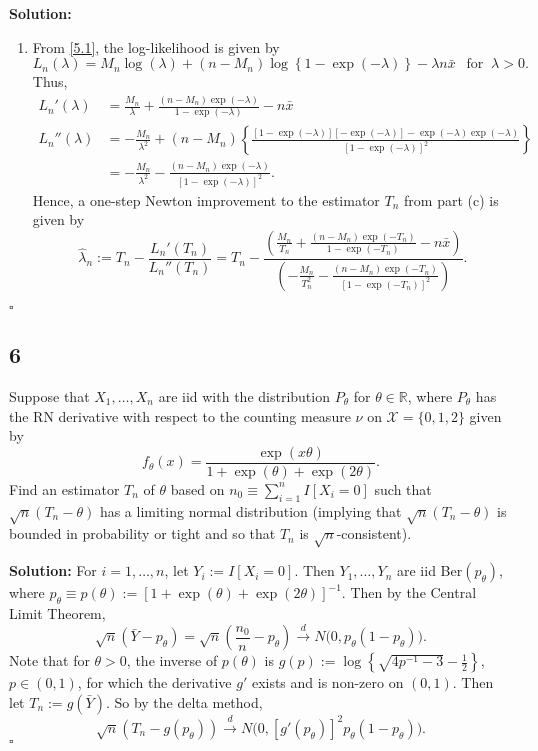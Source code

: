 \documentclass[12pt]{article}
\newcounter{ProofCounter}
\newenvironment{Solution}{\stepcounter{ProofCounter}\textbf{Solution:}}{\hfill$\square$}
\begin{document}
\begin{Solution}
\begin{enumerate}[label=(\alph*),leftmargin=6mm]
    \item From \eqref{5.1}, the log-likelihood is given by 
      \[
        L_n(\lambda) = M_n \log(\lambda) + (n - M_n)\log\left\{ 1 - \exp(-\lambda) \right\} - \lambda n \bar{x}\ \ \text{ for } \ \lambda > 0.
      \]
      Thus,
      \begin{align*}
        L_n'(\lambda) & = \frac{M_n}{\lambda} + \frac{(n-M_n)\exp(-\lambda)}{1 - \exp(-\lambda)} - n\bar{x} \\
        L_n''(\lambda) & = -\frac{M_n}{\lambda^2} + (n - M_n)\left\{ \frac{[1 - \exp(-\lambda)][-\exp(-\lambda)] - \exp(-\lambda)\exp(-\lambda)}{[1 -
        \exp(-\lambda)]^2}\right\} \\
        & = -\frac{M_n}{\lambda^2} - \frac{(n - M_n)\exp(-\lambda)}{[1 - \exp(-\lambda)]^{2}}.
      \end{align*}
      Hence, a one-step Newton improvement to the estimator $T_n$ from part (c) is given by 
      \[
        \hat{\lambda}_n := T_n - \frac{L_n'(T_n)}{L_n''(T_n)} = T_n - \frac{\left( \frac{M_n}{T_n} + \frac{(n-M_n)\exp(-T_n)}{1 - \exp(-T_n)} -
        n\bar{x} \right)}{\left( -\frac{M_n}{T_n^2} - \frac{(n - M_n)\exp(-T_n)}{[1 - \exp(-T_n)]^2} \right)}.
      \]
  \end{enumerate}
\end{Solution}


\subsection*{6}
\begin{tcolorbox}
  Suppose that $X_1,\ldots,X_n$ are iid with the distribution $P_\theta$ for $\theta \in \mathbb{R}$, where $P_\theta$ has the RN derivative with respect to the counting measure $\nu$ on $\mathcal{X}=\{0,1,2\}$ given by
  \[
    f_\theta(x)= \frac{\exp(x\theta)}{1+\exp(\theta)+\exp(2\theta)}.
  \]
  Find an estimator $T_n$ of $\theta$ based on $n_0\equiv \sum_{i=1}^n I[X_i=0]$ such that $\sqrt{n}(T_n-\theta)$ has a limiting normal distribution (implying that $\sqrt{n}(T_n-\theta)$  is bounded in probability or tight and so that $T_n$ is $\sqrt{n}$-consistent).\\
\end{tcolorbox}
\begin{Solution}
  For $i = 1, \dots, n$, let $Y_i := I[X_i = 0]$. Then $Y_1, \dots, Y_n$ are iid Ber$(p_\theta)$, where $p_\theta \equiv p(\theta) := [1 + \exp(\theta) +
  \exp(2\theta)]^{-1}$. Then by the Central Limit Theorem,
  \[
    \sqrt{n}(\bar{Y} - p_{\theta}) = \sqrt{n}\left( \frac{n_0}{n} - p_{\theta} \right) \stackrel{d}{\longrightarrow} N\bigg(0, p_{\theta}(1 - p_{\theta})\bigg).
  \]
  Note that for $\theta > 0$, the inverse of $p(\theta)$ is $g(p) := \log\left\{ \sqrt{4p^{-1} - 3} - \frac{1}{2} \right\}$, $p \in (0,1)$, for which
  the derivative $g'$ exists and is non-zero on $(0,1)$. Then let $T_n := g(\bar{Y})$. So by the delta method,
  \[
    \sqrt{n}\left( T_n - g(p_\theta) \right) \stackrel{d}{\longrightarrow} N\bigg(0, [g'(p_{\theta})]^2p_{\theta}(1-p_{\theta})\bigg).
  \]
\end{Solution}
\end{document}
